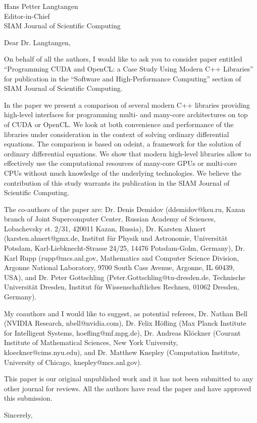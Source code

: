 \documentclass[a4paper,11pt]{letter}
\begin{document}
\begin{letter}{
    Hans Petter Langtangen\\
    Editor-in-Chief\\
    SIAM Journal of Scientific Computing
    }
\opening{Dear Dr. Langtangen,}

On behalf of all the authors, I would like to ask you to consider paper
entitled ``Programming CUDA and OpenCL: a Case Study Using Modern C++
Libraries'' for publication in the ``Software and High-Performance Computing''
section of SIAM Journal of Scientific Computing.

In the paper we present a comparison of several modern C++ libraries providing
high-level interfaces for programming multi- and many-core architectures on top
of CUDA or OpenCL.  We look at both convenience and performance of the
libraries under consideration in the context of solving ordinary differential
equations. The comparison is based on odeint, a framework for the solution of
ordinary differential equations. We show that modern high-level libraries allow
to effectively use the computational resources of many-core GPUs or multi-core
CPUs without much knowledge of the underlying technologies. We believe the
contribution of this study warrants its publication in the SIAM Journal of
Scientific Computing.

The co-authors of the paper are: Dr. Denis Demidov (ddemidov@ksu.ru, Kazan
branch of Joint Supercomputer Center, Russian Academy of Sciences, Lobachevsky
st. 2/31, 420011 Kazan, Russia), Dr. Karsten Ahnert (karsten.ahnert@gmx.de,
Institut f\"ur Physik und Astronomie, Universit\"at Potsdam,
Karl-Liebknecht-Strasse 24/25, 14476 Potsdam-Golm, Germany), Dr. Karl Rupp
(rupp@mcs.anl.gov, Mathematics and Computer Science Division, Argonne National
Laboratory, 9700 South Cass Avenue, Argonne, IL 60439, USA), and Dr. Peter
Gottschling (Peter.Gottschling@tu-dresden.de, Technische Universit\"at Dresden,
Institut f\"ur Wissenschaftliches Rechnen, 01062 Dresden, Germany).

My coauthors and I would like to suggest, as potential referees, Dr. Nathan
Bell (NVIDIA Research, nbell@nvidia.com), Dr. Felix H\"ofling (Max Planck
Institute for Intelligent Systems, hoefling@mf.mpg.de), Dr. Andreas Kl\"ockner
(Courant Institute of Mathematical Sciences, New York University,
kloeckner@cims.nyu.edu), and Dr. Matthew Knepley (Computation Institute,
University of Chicago, knepley@mcs.anl.gov).

This paper is our original unpublished work and it has not been submitted to
any other journal for reviews. All the authors have read the paper and have
approved this submission.

\closing{Sincerely,}

\end{letter}
\end{document}
